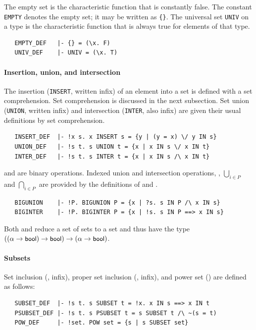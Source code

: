The empty set is the characteristic function that is constantly
false. The constant {\small\verb+EMPTY+} denotes the empty set; it may
be written as {\small\verb+{}+}. The universal set {\small\verb+UNIV+}
on a type is the characteristic function that is always true for
elements of that type.
\begin{hol}
\begin{verbatim}
   EMPTY_DEF   |- {} = (\x. F)
   UNIV_DEF    |- UNIV = (\x. T)
\end{verbatim}
\end{hol}

\paragraph{Insertion, union, and intersection}

The insertion ({\small\verb+INSERT+}, written infix) of an element
into a set is defined with a set comprehension. Set comprehension is
discussed in the next subsection. Set union ({\small\verb+UNION+},
written infix) and intersection ({\small\verb+INTER+}, also infix)
are given their usual definitions by set comprehension.
\begin{hol}
\begin{verbatim}
   INSERT_DEF  |- !x s. x INSERT s = {y | (y = x) \/ y IN s}
   UNION_DEF   |- !s t. s UNION t = {x | x IN s \/ x IN t}
   INTER_DEF   |- !s t. s INTER t = {x | x IN s /\ x IN t}
\end{verbatim}
\end{hol}
 and  are binary
operations. Indexed union and intersection operations, \ie,
$\bigcup_{i \in P}$ and $\bigcap_{i \in P}$ are provided by the
definitions of   and .
\begin{hol}
\begin{verbatim}
   BIGUNION    |- !P. BIGUNION P = {x | ?s. s IN P /\ x IN s}
   BIGINTER    |- !P. BIGINTER P = {x | !s. s IN P ==> x IN s}
\end{verbatim}
\end{hol}
Both  and  reduce a set of sets to a
set and thus have the type
$((\alpha\to\mbox{\small{\textbf{\sf{bool}}}})\to\mbox{\small{\textbf{\sf{bool}}}})\to (\alpha\to\mbox{\small{\textbf{\sf{bool}}}})$.

\paragraph{Subsets}

Set inclusion (, infix), proper set inclusion
(, infix), and power set ()
are defined as follows:
%
\begin{hol}
\begin{verbatim}
   SUBSET_DEF  |- !s t. s SUBSET t = !x. x IN s ==> x IN t
   PSUBSET_DEF |- !s t. s PSUBSET t = s SUBSET t /\ ~(s = t)
   POW_DEF     |- !set. POW set = {s | s SUBSET set}
\end{verbatim}
\end{hol}

